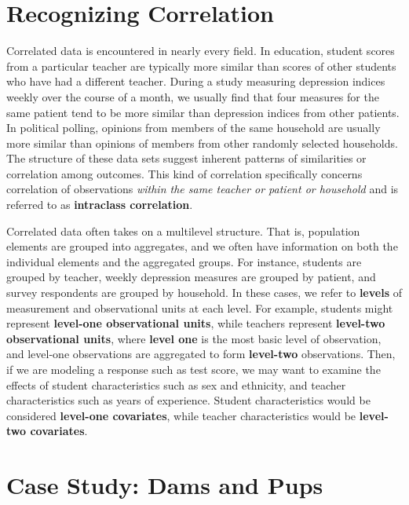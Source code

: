 \documentclass[
]{krantz}
\begin{document}
\hypertarget{recognizing-correlation}{%
\section{Recognizing Correlation}\label{recognizing-correlation}}

Correlated data is encountered in nearly every field. In education, student scores from a particular teacher are typically more similar than scores of other students who have had a different teacher. During a study measuring depression indices weekly over the course of a month, we usually find that four measures for the same patient tend to be more similar than depression indices from other patients. In political polling, opinions from members of the same household are usually more similar than opinions of members from other randomly selected households. The structure of these data sets suggest inherent patterns of similarities or correlation among outcomes. This kind of correlation specifically concerns correlation of observations \emph{within the same teacher or patient or household} and is referred to as \textbf{intraclass correlation}. 

Correlated data often takes on a multilevel structure. That is, population elements are grouped into aggregates, and we often have information on both the individual elements and the aggregated groups. For instance, students are grouped by teacher, weekly depression measures are grouped by patient, and survey respondents are grouped by household. In these cases, we refer to \textbf{levels}  of measurement and observational units at each level. For example, students might represent \textbf{level-one observational units}, while teachers represent \textbf{level-two observational units}, where \textbf{level one} is the most basic level of observation, and level-one observations are aggregated to form \textbf{level-two} observations. Then, if we are modeling a response such as test score, we may want to examine the effects of student characteristics such as sex and ethnicity, and teacher characteristics such as years of experience. Student characteristics would be considered \textbf{level-one covariates}, while teacher characteristics would be \textbf{level-two covariates}.

\hypertarget{case-study-dams-and-pups}{%
\section{Case Study: Dams and Pups}\label{case-study-dams-and-pups}}
\end{document}
